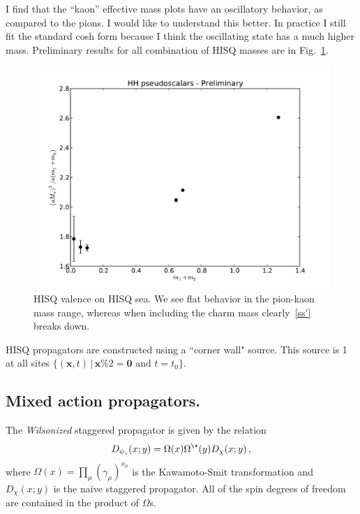 \documentclass[11pt,a4paper]{article}
\begin{document}
I find that the ``kaon'' effective mass plots have an oscillatory behavior, as compared to 
the pions.  
I would like to understand this better.
In practice I still fit the standard cosh form because I think the oscillating state has a much higher mass. Preliminary results for all combination of HISQ masses are in Fig.~\ref{HH_pseudo}.%
\begin{figure}[h]
\centering
\includegraphics[width=\textwidth]{HH_pseudo}
\caption{HISQ valence on HISQ sea.  We see flat behavior in the pion-kaon mass range, whereas
when including the charm mass clearly~\ref{ss'} breaks down.}
\label{HH_pseudo}
\end{figure}

HISQ propagators are constructed using a ``corner wall" source.  This source is 1 at all sites
$\{ (\mathbf{x}, t) \, | \, \mathbf{x} \% 2 = \mathbf{0} \text{ and } t = t_0\}$.

\subsection{Mixed action propagators.}
The \emph{Wilsonized} staggered propagator is given by the relation
\begin{equation}
D_{\psi_s}(x;y) = \Omega(x) \Omega^{\+}(y) D_{\chi}(x;y) \,,
\end{equation}
where $\Omega(x) = \prod_{\mu} (\gamma_\mu)^{x_\mu}$ is the Kawamoto-Smit transformation
and $D_{\chi}(x;y)$ is the naive staggered propagator.
All of the spin degrees of freedom are contained in the product of $\Omega$s.
\end{document}
